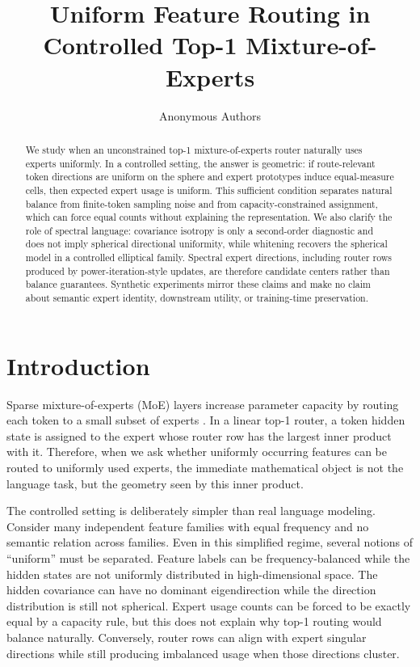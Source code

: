 \documentclass{article}
\title{Uniform Feature Routing in Controlled Top-1 Mixture-of-Experts}
\author{Anonymous Authors}
\begin{document}
\maketitle

\begin{abstract}
We study when an unconstrained top-1 mixture-of-experts router naturally uses
experts uniformly.  In a controlled setting, the answer is geometric: if
route-relevant token directions are uniform on the sphere and expert prototypes
induce equal-measure cells, then expected expert usage is uniform.  This
sufficient condition separates natural balance from finite-token sampling noise
and from capacity-constrained assignment, which can force equal counts without
explaining the representation.  We also clarify the role of spectral language:
covariance isotropy is only a second-order diagnostic and does not imply
spherical directional uniformity, while whitening recovers the spherical model in
a controlled elliptical family.  Spectral expert directions, including router
rows produced by power-iteration-style updates, are therefore candidate centers
rather than balance guarantees.  Synthetic experiments mirror these claims and
make no claim about semantic expert identity, downstream utility, or
training-time preservation.
\end{abstract}

\section{Introduction}

Sparse mixture-of-experts (MoE) layers increase parameter capacity by routing
each token to a small subset of experts \citep{shazeer2017outrageously,
fedus2022switch}.  In a linear top-1 router, a token hidden state is assigned to
the expert whose router row has the largest inner product with it.  Therefore,
when we ask whether uniformly occurring features can be routed to uniformly used
experts, the immediate mathematical object is not the language task, but the
geometry seen by this inner product.

The controlled setting is deliberately simpler than real language modeling.
Consider many independent feature families with equal frequency and no semantic
relation across families.  Even in this simplified regime, several notions of
``uniform'' must be separated.  Feature labels can be frequency-balanced while
the hidden states are not uniformly distributed in high-dimensional space.  The
hidden covariance can have no dominant eigendirection while the direction
distribution is still not spherical.  Expert usage counts can be forced to be
exactly equal by a capacity rule, but this does not explain why top-1 routing
would balance naturally.  Conversely, router rows can align with expert singular
directions while still producing imbalanced usage when those directions cluster.
\end{document}
